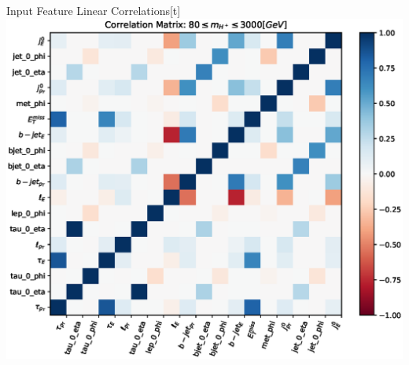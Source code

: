 \documentclass[aspectratio=169,xcolor=table]{beamer}
\begin{document}
    \begin{frame}{Input Feature Linear Correlations}[t]
      \centering
      \includegraphics[height=.95\textheight,keepaspectratio=true]{features_correlation_model_GB100_channel_taulep_mass_80to3000_ntracks_1_nfolds_5_fold_0_nvars_19.eps}
    \end{frame}
\end{document}
